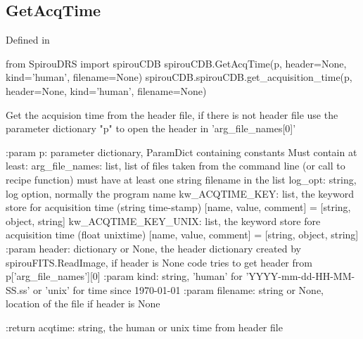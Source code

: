 \noindent\begin{minipage}{\textwidth}
\subsection{GetAcqTime}

Defined in \spirouCDB{}

\begin{pythonbox}
from SpirouDRS import spirouCDB
spirouCDB.GetAcqTime(p, header=None, kind='human', filename=None)
spirouCDB.spirouCDB.get_acquisition_time(p, header=None, kind='human', filename=None)
\end{pythonbox}

\begin{pythondocstring}
Get the acquision time from the header file, if there is not header file
use the parameter dictionary "p" to open the header in 'arg_file_names[0]'

:param p: parameter dictionary, ParamDict containing constants
    Must contain at least:
            arg_file_names: list, list of files taken from the command line
                            (or call to recipe function) must have at least
                            one string filename in the list
            log_opt: string, log option, normally the program name
            kw_ACQTIME_KEY: list, the keyword store for acquisition time
                            (string time-stamp)
                        [name, value, comment] = [string, object, string]
            kw_ACQTIME_KEY_UNIX: list, the keyword store fore acquisition
                                 time (float unixtime)
                        [name, value, comment] = [string, object, string]
:param header: dictionary or None, the header dictionary created by
               spirouFITS.ReadImage, if header is None code tries to get
               header from p['arg_file_names'][0]
:param kind: string, 'human' for 'YYYY-mm-dd-HH-MM-SS.ss' or 'unix'
             for time since 1970-01-01
:param filename: string or None, location of the file if header is None

:return acqtime: string, the human or unix time from header file
\end{pythondocstring}
\end{minipage}

